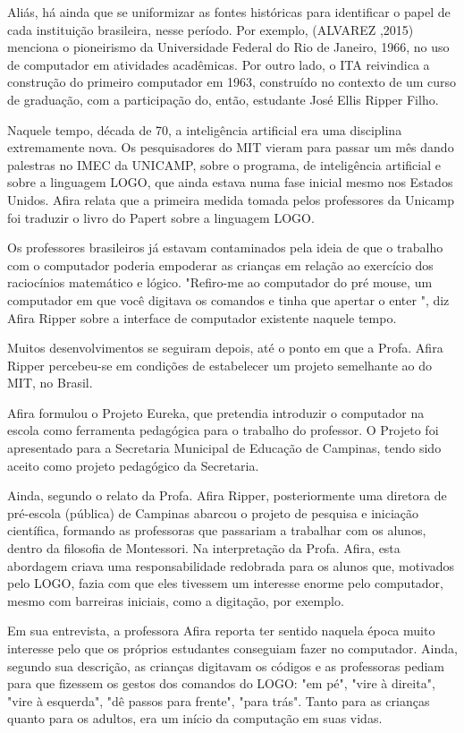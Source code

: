Aliás, há ainda que se uniformizar as fontes históricas para identificar o papel de cada instituição brasileira, nesse período. Por exemplo, (ALVAREZ ,2015) menciona o pioneirismo da Universidade Federal do Rio de Janeiro, 1966, no uso de computador em atividades acadêmicas. Por outro lado, o ITA reivindica a construção do primeiro computador em 1963, construído no contexto de um curso de graduação, com a participação do, então, estudante José Ellis Ripper Filho.

Naquele tempo, década de 70, a inteligência artificial era uma disciplina extremamente nova. Os pesquisadores do MIT vieram para passar um mês dando palestras no IMEC da UNICAMP, sobre o programa, de inteligência artificial e sobre a linguagem LOGO, que ainda estava numa fase inicial mesmo nos Estados Unidos. Afira relata que a primeira medida tomada pelos professores da Unicamp foi traduzir o livro do Papert sobre a linguagem LOGO.

Os professores brasileiros já estavam contaminados pela ideia de que o trabalho com o computador poderia empoderar as crianças em relação ao exercício dos raciocínios matemático e lógico. "Refiro-me ao computador do pré mouse, um computador em que você digitava os comandos e tinha que apertar o enter ", diz Afira Ripper sobre a interface de computador existente naquele tempo.

Muitos desenvolvimentos se seguiram depois, até o ponto em que a Profa. Afira Ripper percebeu-se em condições de estabelecer um projeto semelhante ao do MIT, no Brasil.

Afira formulou o Projeto Eureka, que pretendia introduzir o computador na escola como ferramenta pedagógica para o trabalho do professor. O Projeto foi apresentado para a Secretaria Municipal de Educação de Campinas, tendo sido aceito como projeto pedagógico da Secretaria.

Ainda, segundo o relato da Profa. Afira Ripper, posteriormente uma diretora de pré-escola (pública) de Campinas abarcou o projeto de pesquisa e iniciação científica, formando as professoras que passariam a trabalhar com os alunos, dentro da filosofia de Montessori. Na interpretação da Profa. Afira, esta abordagem criava uma responsabilidade redobrada para os alunos que, motivados pelo LOGO, fazia com que eles tivessem um interesse enorme pelo computador, mesmo com barreiras iniciais, como a digitação, por exemplo.

Em sua entrevista, a professora Afira reporta ter sentido naquela época muito interesse pelo que os próprios estudantes conseguiam fazer no computador. Ainda, segundo sua descrição, as crianças digitavam os códigos e as professoras pediam para que fizessem os gestos dos comandos do LOGO: "em pé", "vire à direita", "vire à esquerda", "dê passos para frente", "para trás". Tanto para as crianças quanto para os adultos, era um início da computação em suas vidas.

